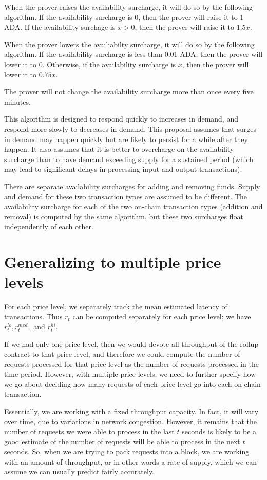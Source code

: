 \documentclass[12pt]{article}
\begin{document}
When the prover raises the availability surcharge, it will do so by the following algorithm. If the availability surcharge is 0, then the prover will raise it to 1 ADA. If the availability surchage is $x > 0$, then the prover will raise it to $1.5x$.

When the prover lowers the availiabilty surcharge, it will do so by the following algorithm. If the availability surcharge is less than 0.01 ADA, then the prover will lower it to 0. Otherwise, if the availability surcharge is $x$, then the prover will lower it to $0.75x$.

The prover will not change the availability surcharge more than once every five minutes.

This algorithm is designed to respond quickly to increases in demand, and respond more slowly to decreases in demand. This proposal assumes that surges in demand may happen quickly but are likely to persist for a while after they happen. It also assumes that it is better to overcharge on the availability surcharge than to have demand exceeding supply for a sustained period (which may lead to significant delays in processing input and output transactions).

There are separate availability surcharges for adding and removing funds. Supply and demand for these two transaction types are assumed to be different. The availability surcharge for each of the two on-chain transaction types (addition and removal) is computed by the same algorithm, but these two surcharges float independently of each other.

\section{Generalizing to multiple price levels}

For each price level, we separately track the mean estimated latency of transactions. Thus $r_t$ can be computed separately for each price level; we have $r_t^{lo}, r_t^{med},$ and $r_t^{hi}$.

If we had only one price level, then we would devote all throughput of the rollup contract to that price level, and therefore we could compute the number of requests processed for that price level as the number of requests processed in the time period. However, with multiple price levels, we need to further specify how we go about deciding how many requests of each price level go into each on-chain transaction.

Essentially, we are working with a fixed throughput capacity. In fact, it will vary over time, due to variations in network congestion. However, it remains that the number of requests we were able to process in the last $t$ seconds is likely to be a good estimate of the number of requests will be able to process in the next $t$ seconds. So, when we are trying to pack requests into a block, we are working with an amount of throughput, or in other words a rate of supply, which we can assume we can usually predict fairly accurately. 
\end{document}
